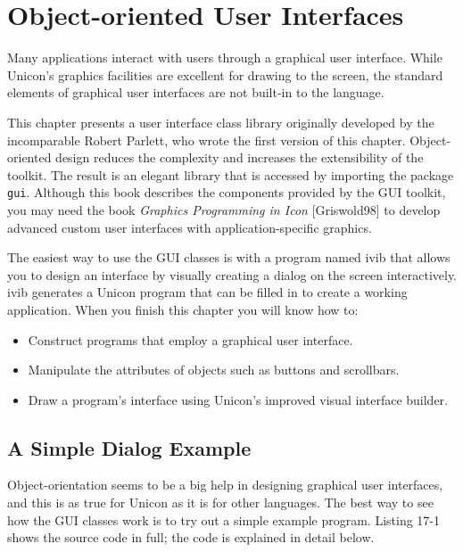 \chapter{Object-oriented User Interfaces}

Many applications interact with users through a graphical
user interface. While
Unicon's graphics facilities are
excellent for drawing to the screen,
the standard elements of graphical
user interfaces are not built-in to the language.

This chapter presents a user interface class library originally developed
by the incomparable Robert Parlett, who wrote the first version of this
chapter. Object-oriented design reduces the
complexity and increases the extensibility of the toolkit. The result is
an elegant library that is accessed by importing the package \texttt{gui}.
Although this book describes the components provided by the
GUI toolkit, you may need the book \textit{Graphics
Programming in Icon} [Griswold98] to develop advanced custom user
interfaces with application-specific graphics.

The easiest way to use the GUI classes is with a program named
\textsf{ivib} that allows you to design an interface by visually
creating a dialog on the screen interactively. \textsf{ivib}
generates a Unicon program that can be filled in to create a working
application. When you finish this chapter you will know how to:

\begin{itemize}
\item Construct programs that employ a graphical user interface.
\item Manipulate the attributes of objects such as buttons and scrollbars.
\item Draw a program's interface using Unicon's improved visual
      interface builder.
\end{itemize}

\section{A Simple Dialog Example}

Object-orientation seems to be a big help in designing
graphical user interfaces, and this is as true for Unicon as it is for
other languages. The best way to see how the GUI classes work is to try
out a simple example program. Listing 17-1 shows the source code in
full; the code is explained in detail below.

